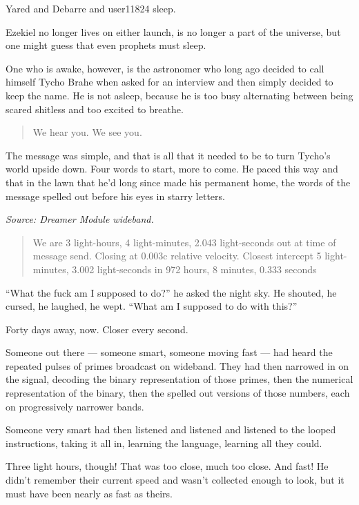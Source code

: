 Yared and Debarre and user11824 sleep.

Ezekiel no longer lives on either launch, is no longer a part of the universe, but one might guess that even prophets must sleep.

One who is awake, however, is the astronomer who long ago decided to call himself Tycho Brahe when asked for an interview and then simply decided to keep the name. He is not asleep, because he is too busy alternating between being scared shitless and too excited to breathe.

\begin{quote}
We hear you. We see you.
\end{quote}

The message was simple, and that is all that it needed to be to turn Tycho's world upside down. Four words to start, more to come. He paced this way and that in the lawn that he'd long since made his permanent home, the words of the message spelled out before his eyes in starry letters.

\emph{Source: Dreamer Module wideband.}

\begin{quote}
We are 3 light-hours, 4 light-minutes, 2.043 light-seconds out at time of message send. Closing at 0.003c relative velocity. Closest intercept 5 light-minutes, 3.002 light-seconds in 972 hours, 8 minutes, 0.333 seconds
\end{quote}

``What the fuck am I supposed to do?'' he asked the night sky. He shouted, he cursed, he laughed, he wept. ``What am I supposed to do with this?''

Forty days away, now. Closer every second.

Someone out there — someone smart, someone moving fast — had heard the repeated pulses of primes broadcast on wideband. They had then narrowed in on the signal, decoding the binary representation of those primes, then the numerical representation of the binary, then the spelled out versions of those numbers, each on progressively narrower bands.

Someone very smart had then listened and listened and listened to the looped instructions, taking it all in, learning the language, learning all they could.

Three light hours, though! That was too close, much too close. And fast! He didn't remember their current speed and wasn't collected enough to look, but it must have been nearly as fast as theirs.

